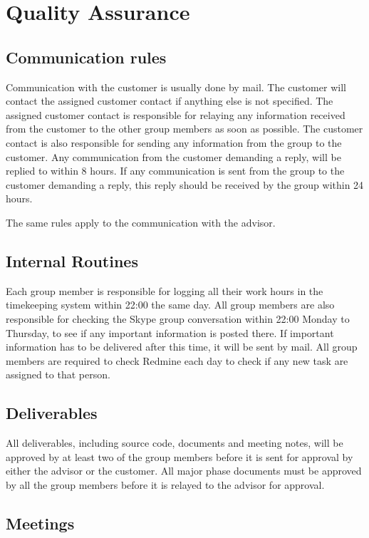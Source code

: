 \section{Quality Assurance}
\subsection{Communication rules}
Communication with the customer is usually done by mail. The customer will contact the assigned customer contact if anything else is not specified. The assigned customer contact is responsible for relaying any information received from the customer to the other group members as soon as possible. The customer contact is also responsible for sending any information from the group to the customer. Any communication from the customer demanding a reply, will be replied to within 8 hours. If any communication is sent from the group to the customer demanding a reply, this reply should be received by the group within 24 hours.

The same rules apply to the communication with the advisor.

\subsection{Internal Routines}
Each group member is responsible for logging all their work hours in the timekeeping system within 22:00 the same day. All group members are also responsible for checking the Skype group conversation within 22:00 Monday to Thursday, to see if any important information is posted there. If important information has to be delivered after this time, it will be sent by mail. All group members are required to check Redmine each day to check if any new task are assigned to that person.

\subsection{Deliverables}
All deliverables, including source code, documents and meeting notes, will be approved by at least two of the group members before it is sent for approval by either the advisor or the customer. All major phase documents must be approved by all the group members before it is relayed to the advisor for approval.

\subsection{Meetings}

